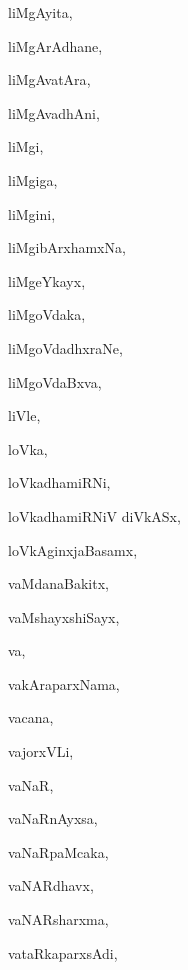 \begin{multicols}{3}
{\noindent
{liMgAyita}, \pageref{liMgAyita}

\noindent
{liMgArAdhane}, \pageref{liMgArAdhane}

\noindent
{liMgAvatAra}, \pageref{liMgAvatAra}

\noindent
{liMgAvadhAni}, \pageref{liMgAvadhAni}

\noindent
{liMgi}, \pageref{liMgi}

\noindent
{liMgiga}, \pageref{liMgiga}

\noindent
{liMgini}, \pageref{liMgini}

\noindent
{liMgibArxhamxNa}, \pageref{liMgibArxhamxNa}

\noindent
{liMgeYkayx}, \pageref{liMgeYkayx}

\noindent
{liMgoVdaka}, \pageref{liMgoVdaka}

\noindent
{liMgoVdadhxraNe}, \pageref{liMgoVdadhxraNe}

\noindent
{liMgoVdaBxva}, \pageref{liMgoVdaBxva}

\noindent
{liVle}, \pageref{liVle}

\noindent
{loVka}, \pageref{loVka}

\noindent
{loVkadhamiRNi}, \pageref{loVkadhamiRNi}

\noindent
{loVkadhamiRNiV diVkASx}, \pageref{loVkadhamiRNiVdiVkASx}

\noindent
{loVkAginxjaBasamx}, \pageref{loVkAginxjaBasamx}

\bigskip
\noindent
{}
\smallskip

\noindent
{vaMdanaBakitx}, \pageref{vaMdanaBakitx}

\noindent
{vaMshayxshiSayx}, \pageref{vaMshayxshiSayx}

\noindent
{va}, \pageref{va}

\noindent
{vakAraparxNama}, \pageref{vakAraparxNama}

\noindent
{vacana}, \pageref{vacana}

\noindent
{vajorxVLi}, \pageref{vajorxVLi}

\noindent
{vaNaR}, \pageref{vaNaR}

\noindent
{vaNaRnAyxsa}, \pageref{vaNaRnAyxsa}

\noindent
{vaNaRpaMcaka}, \pageref{vaNaRpaMcaka}

\noindent
{vaNARdhavx}, \pageref{vaNARdhavx}

\noindent
{vaNARsharxma}, \pageref{vaNARsharxma}

\noindent
{vataRkaparxsAdi}, \pageref{vataRkaparxsAdi}

}
\end{multicols}
